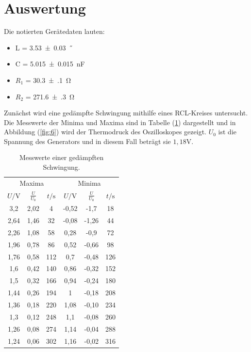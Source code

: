 \section{Auswertung}

Die notierten Gerätedaten lauten:

\begin{itemize}
  \item L = \SI{3.53(3)}{\milli\H}
  \item C = \SI{5.015(15)}{\nano\F}
  \item $R_1$ = \SI{30.3(1)}{\ohm}
  \item $R_2$ = \SI{271.6(3)}{\ohm}
\end{itemize}

Zunächst wird eine gedämpfte Schwingung mithilfe eines RCL-Kreises untersucht.
Die Messwerte der Minima und Maxima sind in Tabelle (\ref{tab:1}) dargestellt und in
Abbildung (\ref{fig:6}) wird der Thermodruck des Oszilloskopes gezeigt. $U_0$ ist die Spannung
des Generators und in diesem Fall beträgt sie $1,18\si{\V}$.

\begin{table}[H]
  \centering
  \caption{Messwerte einer gedämpften Schwingung.}
  \label{tab:1}
  \begin{tabular}{c c c c c c}
    \toprule
    \multicolumn{3}{c}{Maxima} & \multicolumn{3}{c}{Minima} \\
    \cmidrule(lr){1-3}\cmidrule(lr){4-6}
    $U / \si{\V}$ & $\frac{U}{U_0}$ & $t / \si{\second}$ & $U / \si{\V}$ & $\frac{U}{U_0}$ & $t / \si{\second}$ \\
    \midrule
    3,2     & 2,02  &    4 & -0,52 &  -1,7   &  18 \\
    2,64    & 1,46  &   32 & -0,08 &  -1,26  &  44 \\
    2,26    & 1,08  &   58 & 0,28 &  -0,9   &  72 \\
    1,96    & 0,78  &   86 & 0,52 &  -0,66  &  98 \\
    1,76    & 0,58  &  112 & 0,7 &  -0,48  & 126 \\
    1,6     & 0,42  &  140 & 0,86 &  -0,32  & 152 \\
    1,5     & 0,32  &  166 & 0,94 &  -0,24  & 180 \\
    1,44    & 0,26  &  194 & 1 &  -0,18  & 208 \\
    1,36    & 0,18  &  220 & 1,08 &  -0,10  & 234 \\
    1,3     & 0,12  &  248 & 1,1 &  -0,08  & 260 \\
    1,26    & 0,08  &  274 & 1,14 &  -0,04  & 288 \\
    1,24    & 0,06  &  302 & 1,16 &  -0,02  & 316 \\
    \bottomrule
  \end{tabular}
\end{table}

